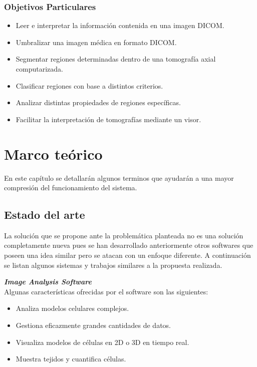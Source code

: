 \documentclass[12pt]{report}
\begin{document}
\subsection{Objetivos Particulares}
\begin{itemize}
\item Leer e interpretar la información contenida en una imagen DICOM.
\item Umbralizar una imagen médica en formato DICOM.
\item Segmentar regiones determinadas dentro de una tomografía axial computarizada.
\item Clasificar regiones con base a distintos criterios.
\item Analizar distintas propiedades de regiones específicas.
\item Facilitar la interpretación de tomografías mediante un visor.
\end{itemize}


\chapter{Marco teórico}
En este capítulo se detallarán algunos terminos que ayudarán a una mayor compresión del funcionamiento del sistema.
\section{Estado del arte}
La solución que se propone ante la problemática planteada no es una solución completamente nueva pues se han desarrollado anteriormente otros softwares que poseen una idea similar pero se atacan con un enfoque diferente. A continuación se listan algunos sistemas y trabajos similares a la propuesta realizada.

\hfill\break
\textbf{\textit{Image Analysis Software}}\cite{ims}
\\Algunas características ofrecidas por el software son las siguientes:
\begin{itemize}
\item Analiza modelos celulares complejos.
\item Gestiona eficazmente grandes cantidades de datos.
\item Visualiza modelos de células en 2D o 3D en tiempo real.
\item Muestra tejidos y cuantifica células.
\end{itemize}
\end{document}
